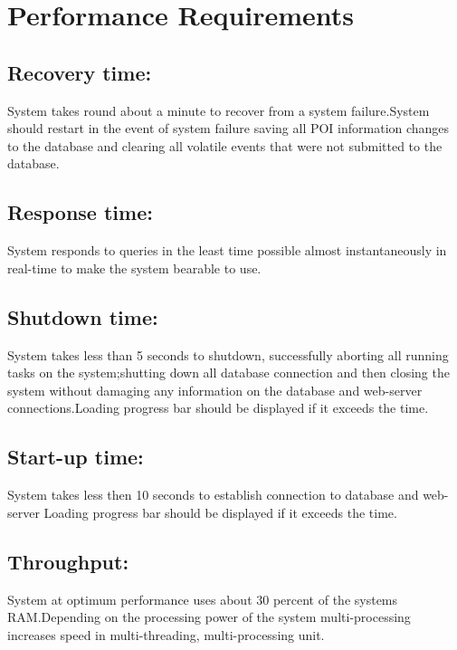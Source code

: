 
\section{Performance Requirements}
\subsection{Recovery time:}
	System takes round about a minute to recover from a system failure.System should restart in the event of system failure saving all POI information changes to the database and clearing all volatile events that were  not submitted to the database.
\subsection{Response time:}
	System responds to queries in the least time possible almost instantaneously in real-time  to make the system bearable to use.
\subsection{Shutdown time:}
	System takes less than 5 seconds to shutdown, successfully aborting all running tasks on the system;shutting down all database connection and then closing the system without damaging any information on the database and web-server connections.Loading 			progress bar should be displayed if it exceeds the time.
\subsection{Start-up time:}
	System takes less then 10 seconds to establish connection to database and web-server
	Loading progress bar should be displayed if it exceeds the time.
\subsection{Throughput:}
	System at optimum performance uses about 30 percent of the systems RAM.Depending on the processing power of the system multi-processing increases speed in multi-threading, multi-processing unit.

